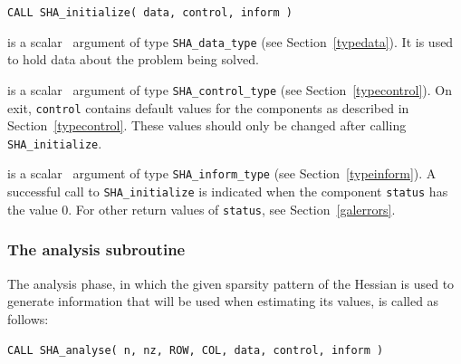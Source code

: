\documentclass{galahad}
\newcommand{\packagename}{SHA}
\begin{document}
\hspace{8mm}
{\tt CALL \packagename\_initialize( data, control, inform )}

\vspace*{-3mm}
\begin{description}

 is a scalar \intentinout\ argument of type
{\tt \packagename\_data\_type}
(see Section~\ref{typedata}). It is used to hold data about the problem being
solved.

 is a scalar \intentout\ argument of type
{\tt \packagename\_control\_type}
(see Section~\ref{typecontrol}).
On exit, {\tt control} contains default values for the components as
described in Section~\ref{typecontrol}.
These values should only be changed after calling
{\tt \packagename\_initialize}.

 is a scalar \intentout\ argument of type
{\tt \packagename\_inform\_type}
(see Section~\ref{typeinform}). A successful call to
{\tt \packagename\_initialize}
is indicated when the  component {\tt status} has the value 0.
For other return values of {\tt status}, see Section~\ref{galerrors}.

\end{description}


\subsubsection{The analysis subroutine}
The analysis phase, in which the given sparsity pattern of the Hessian
is used to generate information that will be used when estimating
its values, is called as follows:

\vspace*{1mm}

\hspace{8mm}
{\tt CALL \packagename\_analyse( n, nz, ROW, COL, data, control, inform )}
\end{document}
